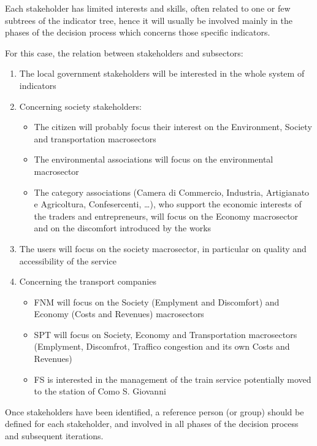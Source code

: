Each stakeholder has limited interests and skills, often related to one or few subtrees of the indicator tree, hence it will usually be involved mainly in the phases of the decision process which concerns those specific indicators. 

For this case, the relation between stakeholders and subsectors:
\begin{enumerate}
	\item The local government stakeholders will be interested in the whole system of indicators
	
	\item Concerning society stakeholders: 
	\begin{itemize}
		\item The citizen will probably focus their interest on the Environment, Society and transportation macrosectors
		
		\item The environmental associations will focus on the environmental macrosector
		
		\item The category associations (Camera di Commercio, Industria, Artigianato e Agricoltura, Confesercenti, \dots), who support the economic interests of the traders and entrepreneurs, will focus on the Economy macrosector and on the discomfort introduced by the works
	\end{itemize}
	
	\item The users will focus on the society macrosector, in particular on quality and accessibility of the service
	
	\item Concerning the transport companies
	\begin{itemize}
		\item FNM will focus on the Society (Emplyment and Discomfort) and Economy (Costs and Revenues) macrosectors
		
		\item SPT will focus on Society, Economy and Transportation macrosectors (Emplyment, Discomfrot, Traffico congestion and its own Costs and Revenues)
		
		\item FS is interested in the management of the train service potentially moved to the station of Como S. Giovanni
	\end{itemize}
\end{enumerate}

Once stakeholders have been identified, a reference person (or group) should be defined for each stakeholder, and involved in all phases of the decision process and subsequent iterations. 

